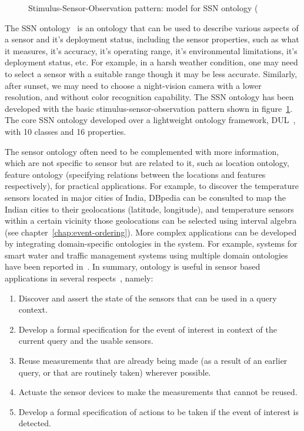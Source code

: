 \begin{figure}[!htbp]
	\centerline{
	}
	\caption{Stimulus-Sensor-Observation pattern: model for SSN ontology (}
	\label{fig:knowledge:ssn-model}
\end{figure}

 
The SSN ontology~\citep{Compton:2012} is an ontology that can be used to describe various aspects of a sensor and it's deployment
status, including the sensor properties, such as what it measures, it's accuracy, it's operating range, it's environmental
limitations, it's deployment status, etc. For example, in a harsh weather condition, one may need to select a sensor with a 
suitable range though it may be less accurate. Similarly, after sunset, we may need to choose a night-vision camera with a lower 
resolution, and without color recognition capability. The SSN ontology has been developed with the basic stimulus-sensor-observation 
pattern shown in figure~\ref{fig:knowledge:ssn-model}. The core SSN ontology developed over a lightweight ontology framework,
DUL~\citep{Scherp:2009}, with 10 classes and 16 properties.

 
The sensor ontology often need to be complemented with more information, which are not specific to sensor but are related to it, such as 
location ontology, feature ontology (specifying relations between the locations and features respectively), for practical applications.
For example, to discover the temperature sensors located in major cities of India, DBpedia can be consulted to map the Indian
cities to their geolocations (latitude, longitude), and temperature sensors within a certain vicinity those geolocations can be 
selected using interval algebra (see chapter~\ref{chap:event-ordering}). 
More complex applications can be developed by integrating domain-specific ontologies in the system. For example, systems for smart 
water and traffic management systems using multiple domain ontologies have been reported in~\citep{Goel:2017:1,Goel:2017:2}.
%
In summary, ontology is useful in sensor based applications in several respects~\citep{Taylor:2011}, namely:
\begin{enumerate}
	\item Discover and assert the state of the sensors that can be used in a query context.
	\item Develop a formal specification for the event of interest in context of the current query and the usable sensors.
	\item Reuse measurements that are already being made (as a result of an earlier query, or that are routinely taken) wherever 
		possible.
	\item Actuate the sensor devices to make the measurements that cannot be reused.
	\item Develop a formal specification of actions to be taken if the event of interest is detected. 
\end{enumerate}

